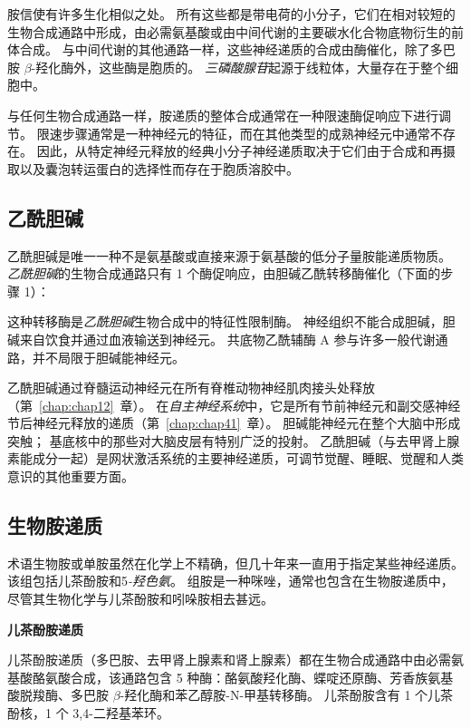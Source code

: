胺信使有许多生化相似之处。
所有这些都是带电荷的小分子，它们在相对较短的生物合成通路中形成，由必需氨基酸或由中间代谢的主要碳水化合物底物衍生的前体合成。
与中间代谢的其他通路一样，这些神经递质的合成由酶催化，除了多巴胺 $\beta$-羟化酶外，这些酶是胞质的。
\textit{三磷酸腺苷}起源于线粒体，大量存在于整个细胞中。


与任何生物合成通路一样，胺递质的整体合成通常在一种限速酶促响应下进行调节。
限速步骤通常是一种神经元的特征，而在其他类型的成熟神经元中通常不存在。
因此，从特定神经元释放的经典小分子神经递质取决于它们由于合成和再摄取以及囊泡转运蛋白的选择性而存在于胞质溶胶中。



\subsection{乙酰胆碱}

乙酰胆碱是唯一一种不是氨基酸或直接来源于氨基酸的低分子量胺能递质物质。
\textit{乙酰胆碱}的生物合成通路只有 1 个酶促响应，由胆碱乙酰转移酶催化（下面的步骤 1）：


这种转移酶是\textit{乙酰胆碱}生物合成中的特征性限制酶。
神经组织不能合成胆碱，胆碱来自饮食并通过血液输送到神经元。
共底物乙酰辅酶 A 参与许多一般代谢通路，并不局限于胆碱能神经元。


乙酰胆碱通过脊髓运动神经元在所有脊椎动物神经肌肉接头处释放（第~\ref{chap:chap12}~章）。
在\textit{自主神经系统}中，它是所有节前神经元和副交感神经节后神经元释放的递质（第~\ref{chap:chap41}~章）。
胆碱能神经元在整个大脑中形成突触；
基底核中的那些对大脑皮层有特别广泛的投射。
乙酰胆碱（与去甲肾上腺素能成分一起）是网状激活系统的主要神经递质，可调节觉醒、睡眠、觉醒和人类意识的其他重要方面。




\subsection{生物胺递质}

术语生物胺或单胺虽然在化学上不精确，但几十年来一直用于指定某些神经递质。
该组包括儿茶酚胺和5\textit{-羟色氨}。
组胺是一种咪唑，通常也包含在生物胺递质中，尽管其生物化学与儿茶酚胺和吲哚胺相去甚远。


\textbf{儿茶酚胺递质}

儿茶酚胺递质（多巴胺、去甲肾上腺素和肾上腺素）都在生物合成通路中由必需氨基酸酪氨酸合成，该通路包含 5 种酶：酪氨酸羟化酶、蝶啶还原酶、芳香族氨基酸脱羧酶、多巴胺 $\beta$-羟化酶和苯乙醇胺-N-甲基转移酶。
儿茶酚胺含有 1 个儿茶酚核，1 个 3,4-二羟基苯环。


